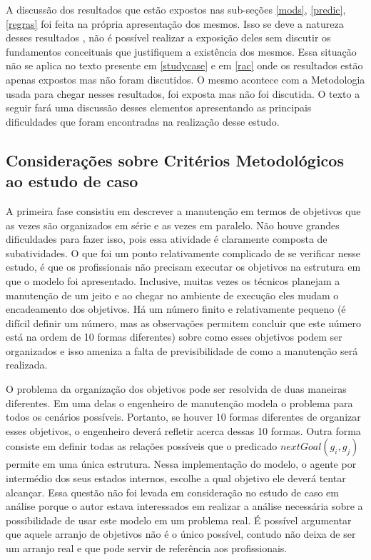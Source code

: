 A discussão dos resultados que estão expostos nas sub-seções \ref{mods}, \ref{predic}, \ref{regras} foi feita na própria apresentação dos mesmos. Isso se deve a natureza desses resultados , não é possível realizar a exposição deles sem discutir os fundamentos conceituais que justifiquem a existência dos mesmos. Essa situação não se aplica no texto presente em \ref{studycase} e em \ref{rac} onde os resultados estão apenas expostos mas não foram discutidos. O mesmo acontece com a Metodologia usada para chegar nesses resultados, foi exposta mas não foi discutida. O texto a seguir fará uma discussão desses elementos apresentando as principais dificuldades que foram encontradas na realização desse estudo. 

\subsection{Considerações sobre Critérios Metodológicos ao estudo de caso} \label{conscritmetcasoestudo}

A primeira fase consistiu em descrever a manutenção em termos de objetivos que as vezes são organizados em série e as vezes em paralelo. Não houve grandes dificuldades para fazer isso, pois essa atividade é claramente composta de subatividades. O que foi um ponto relativamente complicado de se verificar nesse estudo, é que os profissionais não precisam executar os objetivos na estrutura em que o modelo foi apresentado. Inclusive, muitas vezes os técnicos planejam a manutenção de um jeito e ao chegar no ambiente de execução eles mudam o encadeamento dos objetivos. Há um número finito e relativamente pequeno (é difícil definir um número, mas as observações permitem concluir que este número está na ordem de 10 formas diferentes) sobre como esses objetivos podem ser organizados e isso ameniza a falta de previsibilidade de como a manutenção será realizada. 

O problema da organização dos objetivos pode ser resolvida de duas maneiras diferentes. Em uma delas o engenheiro de manutenção modela o problema para todos os cenários possíveis. Portanto, se houver 10 formas diferentes de organizar esses objetivos, o engenheiro deverá refletir acerca dessas 10 formas. Outra forma consiste em definir todas as relações possíveis que o predicado $nextGoal(g_i,g_j)$ permite em uma única estrutura. Nessa implementação do modelo, o agente por intermédio dos seus estados internos, escolhe a qual objetivo ele deverá tentar alcançar. Essa questão não foi levada em consideração no estudo de caso em análise porque o autor estava interessados em realizar a análise necessária sobre a possibilidade de usar este modelo em um problema real. É possível argumentar que aquele arranjo de objetivos não é o único possível, contudo não deixa de ser um arranjo real e que pode servir de referência aos profissionais. 

